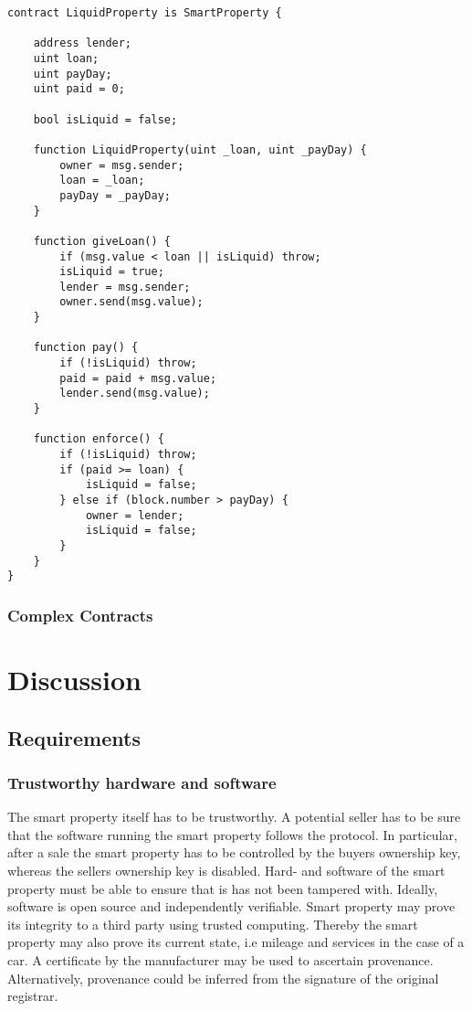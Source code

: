 \begin{lstlisting}[breaklines,basicstyle=\tiny]
contract LiquidProperty is SmartProperty {
    
    address lender;
    uint loan;
    uint payDay;
    uint paid = 0;
    
    bool isLiquid = false;
    
    function LiquidProperty(uint _loan, uint _payDay) {
        owner = msg.sender;
        loan = _loan;
        payDay = _payDay;
    }
    
    function giveLoan() {
        if (msg.value < loan || isLiquid) throw;
        isLiquid = true;
        lender = msg.sender;
        owner.send(msg.value);
    }
    
    function pay() {
        if (!isLiquid) throw;
        paid = paid + msg.value;
        lender.send(msg.value);
    }
    
    function enforce() {
        if (!isLiquid) throw;
        if (paid >= loan) {
            isLiquid = false;
        } else if (block.number > payDay) {
            owner = lender;
            isLiquid = false;
        }
    }
}
\end{lstlisting}

\subsubsection{Complex Contracts}


\section{Discussion}

\subsection{Requirements}

\subsubsection{Trustworthy hardware and software}

The smart property itself has to be trustworthy. A potential seller has to be sure that the software running the smart property follows the protocol. In particular, after a sale the smart property has to be controlled by the buyers ownership key, whereas the sellers ownership key is disabled. Hard- and software of the smart property must be able to ensure that is has not been tampered with. Ideally, software is open source and independently verifiable. Smart property may prove its integrity to a third party using trusted computing. Thereby the smart property may also prove its current state, i.e mileage and services in the case of a car. A certificate by the manufacturer may be used to ascertain provenance. Alternatively, provenance could be inferred from the signature of the original registrar.


